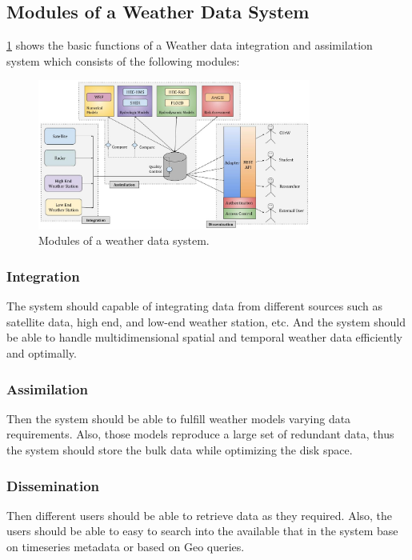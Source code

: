 \subsection{Modules of a Weather Data System}
\label{subse:modules_weather_data_integration_sys}

\cref{fi:wdia_components} shows the basic functions of a Weather data integration and assimilation system which consists of the following modules:

\begin{figure}[htbp]
\centerline{\includegraphics[width=0.8\textwidth]{method/misc/weather_data_system_components.jpg}}
\caption{Modules of a weather data system.}
\label{fi:wdia_components}
\end{figure}

\subsubsection{Integration}
The system should capable of integrating data from different sources such as satellite data, high end, and low-end weather station, etc. And the system should be able to handle multidimensional spatial and temporal weather data efficiently and optimally. 
\subsubsection{Assimilation}
Then the system should be able to fulfill weather models varying data requirements. Also, those models reproduce a large set of redundant data, thus the system should store the bulk data while optimizing the disk space.
\subsubsection{Dissemination}
Then different users should be able to retrieve data as they required. Also, the users should be able to easy to search into the available that in the system base on timeseries metadata or based on Geo queries.


